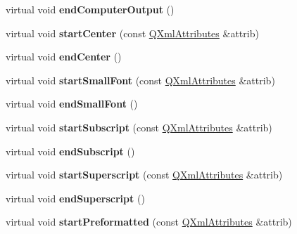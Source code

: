 \begin{DoxyCompactItemize}
virtual void {\bfseries end\+Computer\+Output} ()
\item 
\mbox{\label{class_markup_handler_acfd5b3daf72a1ebb3232e64740da37c6}} 
virtual void {\bfseries start\+Center} (const \mbox{\hyperlink{class_q_xml_attributes}{Q\+Xml\+Attributes}} \&attrib)
\item 
\mbox{\label{class_markup_handler_a8fe6abf006123e01d33f8fc66154a2f0}} 
virtual void {\bfseries end\+Center} ()
\item 
\mbox{\label{class_markup_handler_a31e9c776ff9091c985f37ff1523886d2}} 
virtual void {\bfseries start\+Small\+Font} (const \mbox{\hyperlink{class_q_xml_attributes}{Q\+Xml\+Attributes}} \&attrib)
\item 
\mbox{\label{class_markup_handler_a80ee62220712713e289593d770b896a8}} 
virtual void {\bfseries end\+Small\+Font} ()
\item 
\mbox{\label{class_markup_handler_aa15c2ef518eec3c545a3b36c47ee1829}} 
virtual void {\bfseries start\+Subscript} (const \mbox{\hyperlink{class_q_xml_attributes}{Q\+Xml\+Attributes}} \&attrib)
\item 
\mbox{\label{class_markup_handler_ad3f41776e690f126f6e11d1d41702e52}} 
virtual void {\bfseries end\+Subscript} ()
\item 
\mbox{\label{class_markup_handler_a9e350d168cdee6d4a228193fedc7614b}} 
virtual void {\bfseries start\+Superscript} (const \mbox{\hyperlink{class_q_xml_attributes}{Q\+Xml\+Attributes}} \&attrib)
\item 
\mbox{\label{class_markup_handler_a470b54b87ea162a849f36e2aa218f55e}} 
virtual void {\bfseries end\+Superscript} ()
\item 
\mbox{\label{class_markup_handler_a19d069d30a4cea68f962055f8fe3a39d}} 
virtual void {\bfseries start\+Preformatted} (const \mbox{\hyperlink{class_q_xml_attributes}{Q\+Xml\+Attributes}} \&attrib)
\item 
\mbox{\label{class_markup_handler_a2bc9b48c59f35ef03c46420c7ccbdf0b}} 

\end{DoxyCompactItemize}
